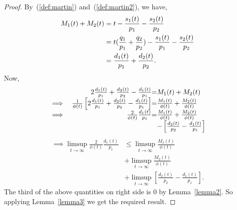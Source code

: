 \documentclass[letterpaper, 10 pt, conference]{ieeeconf}
\begin{document}
\begin{proof} By~(\ref{def:martin}) and~(\ref{def:martin2}), we have,
\begin{align}
M_{1}(t) + M_{2}(t) &= t - \frac{s_{1} (t)}{p_{1}} -\frac{s_{2} (t) }{p_{2}}\notag\\
&= t(\frac{q_{1}}{p_{1}}  + \frac{q_{2}}{p_{2}})  - \frac{s_{1} (t)}{p_{1}} -\frac{s_{2} (t) }{p_{2}}\notag\\
&= \frac{d_{1} (t)}{p_{1}} + \frac{d_{2} (t)}{p_{2}}.
\end{align}
Now,
\begin{align*}
\begin{array}{rr@{\hspace{0em}}c@{\hspace{0em}}l}
& 2\frac{d_{1} (t)}{p_{1}} + \frac{d_{2} (t)}{p_{2}}-\frac{d_{1} (t)}{p_{1}} &=& M_{1}(t) + M_{2}(t) \notag \\
\implies &\frac{1}{\phi(t)}   \left[2\frac{d_{1} (t)}{p_{1}} + \frac{d_{2} (t)}{p_{2}}-\frac{d_{1} (t)}{p_{1}} \right] &=&\frac{M_{1}(t) }{\phi(t)}+ \frac{M_{2}(t)}{\phi(t)}\\
\implies &\frac{2}{\phi(t)}   \frac{d_{1} (t)}{p_{1}}  &=&\frac{M_{1}(t) }{\phi(t)}+ \frac{M_{2}(t)}{\phi(t)} \\
&&& -\left[  \frac{d_{2} (t)}{p_{2}}-\frac{d_{1} (t)}{p_{1}}    \right]\\
\end{array}
\end{align*}
\begin{align*}
\implies \limsup_{t\to\infty}\frac{2}{\phi(t)}   \frac{d_{1} (t)}{p_{1}}  &\leq \limsup_{t\to\infty}\frac{M_{1}(t) }{\phi(t)}\\
&+ \limsup_{t\to\infty}\frac{M_{2}(t)}{\phi(t)} \\
&+\limsup_{t\to\infty} \left[  \frac{d_{2} (t)}{p_{2}}-\frac{d_{1} (t)}{p_{1}}    \right].
\end{align*}
The third of the above quantities on right side is $0$ by Lemma~\ref{lemma2}. So applying Lemma~\ref{lemma3} we get the required result. 
\end{proof}
\end{document}
